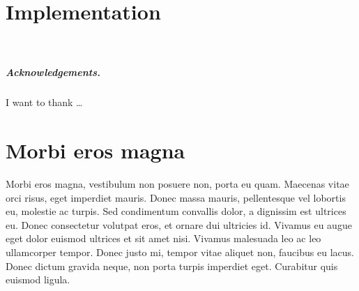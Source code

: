\documentclass[a4paper,UKenglish]{lipics-v2016}
\begin{document}
\section{Implementation}
\label{sec:impl}

~
\newpage

\subparagraph*{Acknowledgements.}

I want to thank \dots

\appendix
\section{Morbi eros magna}

Morbi eros magna, vestibulum non posuere non, porta eu quam. Maecenas vitae orci risus, eget imperdiet mauris. Donec massa mauris, pellentesque vel lobortis eu, molestie ac turpis. Sed condimentum convallis dolor, a dignissim est ultrices eu. Donec consectetur volutpat eros, et ornare dui ultricies id. Vivamus eu augue eget dolor euismod ultrices et sit amet nisi. Vivamus malesuada leo ac leo ullamcorper tempor. Donec justo mi, tempor vitae aliquet non, faucibus eu lacus. Donec dictum gravida neque, non porta turpis imperdiet eget. Curabitur quis euismod ligula. 






\end{document}
